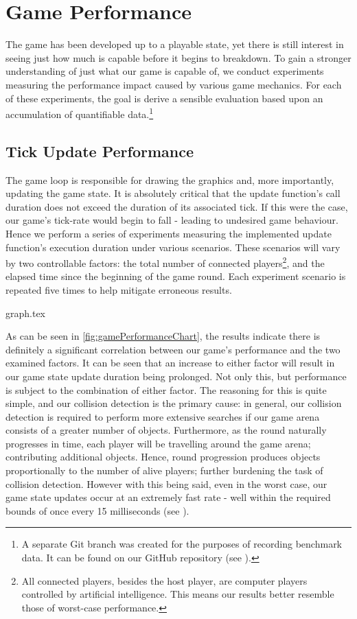 \documentclass{standalone}
\begin{document}
	\section{Game Performance}
		The game has been developed up to a playable state, yet there is still interest in seeing just how much is capable before it begins to breakdown. To gain a stronger understanding of just what our game is capable of, we conduct experiments measuring the performance impact caused by various game mechanics. For each of these experiments, the goal is derive a sensible evaluation based upon an accumulation of quantifiable data.\footnote{A separate Git branch was created for the purposes of recording benchmark data. It can be found on our GitHub repository (see ).}

		\subsection{Tick Update Performance}
			The game loop is responsible for drawing the graphics and, more importantly, updating the game state. It is absolutely critical that the update function's call duration does not exceed the duration of its associated tick. If this were the case, our game's tick-rate would begin to fall - leading to undesired game behaviour. Hence we perform a series of experiments measuring the implemented update function's execution duration under various scenarios. These scenarios will vary by two controllable factors: the total number of connected players\footnote{All connected players, besides the host player, are computer players controlled by artificial intelligence. This means our results better resemble those of worst-case performance.}, and the elapsed time since the beginning of the game round. Each experiment scenario is repeated five times to help mitigate erroneous results.

			\thispagestyle{empty}
				{graph.tex}

			As can be seen in \autoref{fig:gamePerformanceChart}, the results indicate there is definitely a significant correlation between our game's performance and the two examined factors. It can be seen that an increase to either factor will result in our game state update duration being prolonged. Not only this, but performance is subject to the combination of either factor. The reasoning for this is quite simple, and our collision detection is the primary cause: in general, our collision detection is required to perform more extensive searches if our game arena consists of a greater number of objects. Furthermore, as the round naturally progresses in time, each player will be travelling around the game arena; contributing additional objects. Hence, round progression produces objects proportionally to the number of alive players; further burdening the task of collision detection. However with this being said, even in the worst case, our game state updates occur at an extremely fast rate - well within the required bounds of once every 15 milliseconds (see ).
\end{document}
